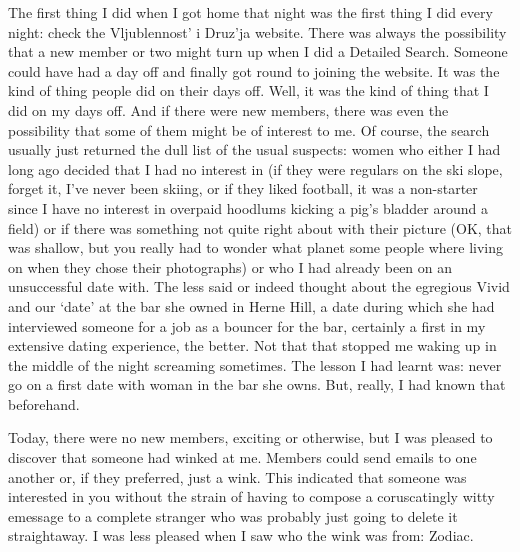 
\twelverm
The first thing I did when I got home that night was the first thing
I did every night: check the Vljublennost' i Druz'ja website. There
was always the possibility that a new member or two might turn up
when I did a Detailed Search. Someone could have had a day off and
finally got round to joining the website. It was the kind of thing
people did on their days off. Well, it was the kind of thing that I
did on my days off. And if there were new members, there was even
the possibility that some of them might be of interest to me. Of
course, the search usually just returned the dull list of the usual
suspects: women who either I had long ago decided that I had no
interest in (if they were regulars on the ski slope, forget it, I've
never been skiing, or if they liked football, it was a non-starter
since I have no interest in overpaid hoodlums kicking a pig's bladder around
a field) or if there was something not quite right about with their
picture (OK, that was shallow, but you really had to wonder what
planet some people where living on when they chose their
photographs) or who I had already been on an unsuccessful date with.
The less said or indeed thought about the egregious Vivid and our
`date' at the bar she owned in Herne Hill, a date during which she
had interviewed someone for a job as a bouncer for the bar,
certainly a first in my extensive dating experience, the better. Not
that that stopped me waking up in the middle of the night screaming
sometimes. The lesson I had learnt was: never go on a first date
with woman in the bar she owns. But, really, I had known that
beforehand.

Today, there were no new members, exciting or otherwise, but I was
pleased to discover that someone had winked at me. Members could
send emails to one another or, if they preferred, just a wink. This
indicated that someone was interested in you without the strain of
having to compose a coruscatingly witty emessage to a complete
stranger who was probably just going to delete it straightaway. I
was less pleased when I saw who the wink was from: Zodiac.

